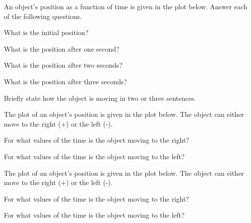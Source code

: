 

\begin{problem}
\item An object's position as a function of time is given in the plot
  below. Answer each of the following questions.

  \scalebox{0.5}{}

  \begin{subproblem}
  \item What is the initial position?
    \vfill

  \item What is the position after one second?
    \vfill
      
  \item What is the position after two seconds?
    \vfill

  \item What is the position after three seconds?
    \vfill

  \item Briefly state how the object is moving in two or three
    sentences. 
    \vfill

  \end{subproblem}

  \clearpage

\item The plot of an object's position is given in the plot below. The
  object can either move to the right (+) or the left (-).

  \scalebox{0.4}{}

  \begin{subproblem}
    \item For what values of the time is the object moving to the
      right?
      \vfill
    \item For what values of the time is the object moving to the
      left?
      \vfill
  \end{subproblem}

\item The plot of an object's position is given in the plot below. The
  object can either move to the right (+) or the left (-).

  \scalebox{0.4}{}

  \begin{subproblem}
    \item For what values of the time is the object moving to the
      right?
      \vfill
    \item For what values of the time is the object moving to the
      left?
      \vfill
  \end{subproblem}

\end{problem}

